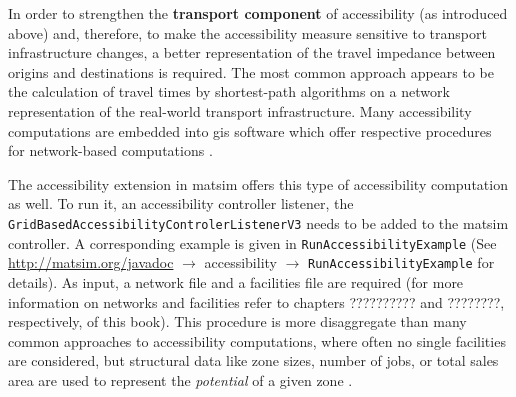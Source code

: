 In order to strengthen the \textbf{transport component} of accessibility (as introduced above) and, therefore, to 
make the accessibility measure sensitive to transport infrastructure changes, a better representation of the travel 
impedance between origins and destinations is required. The most common approach appears to be the calculation of 
travel times by shortest-path algorithms on a network representation of the real-world transport infrastructure.
Many accessibility computations are embedded into \gls{gis} software which offer respective procedures for network-based 
computations 
\citep{BBSR20xxErreichbarkeitsmodell, CurtisEtAl2013AccessibilityPolicyInnovation, BuettnerEtAl2010Erreichbarkeitsatlas}.

%

The accessibility extension in \gls{matsim} offers this type of accessibility computation as well. To run it, an 
accessibility controller listener, \eg the \lstinline{GridBasedAccessibilityControlerListenerV3} needs to be added to 
the \gls{matsim} controller. A corresponding example is given in \lstinline{RunAccessibilityExample} (See
\url{http://matsim.org/javadoc} $\to$ accessibility $\to$ \lstinline{RunAccessibilityExample} for details). As input, a 
network file and a facilities file are required
(for more information on networks and facilities refer to chapters ?????????? and ????????, respectively, of this book).
This procedure is more disaggregate than many common approaches to accessibility computations, where often no single 
facilities are considered, but structural data like zone sizes, number of jobs, or total sales area are used to 
represent the \textit{potential} of a given zone 
\citep{BuettnerEtAl2010Erreichbarkeitsatlas, GulhanEtAl2014PotentialAccessibilityMeasureDenizli}.


